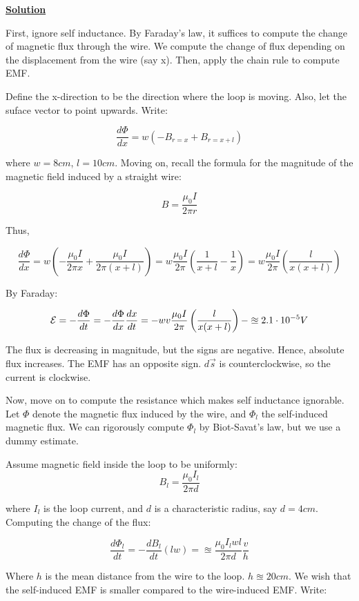\documentclass{article}
\newcommand{\new}[1]{
    \vspace{2mm}
    \noindent
    \textbf{
    \underline{#1}}
}
\begin{document}
\new{Solution}
First, ignore self inductance. By Faraday's law, it suffices 
to compute the change of magnetic flux through the wire. 
We compute the change of flux depending on the displacement from 
the wire (say x). Then, apply the chain rule to compute EMF. 

Define the x-direction to be the direction where the loop is moving. 
Also, let the suface vector to point upwards. 
Write:

\[
    \frac{d \Phi}{dx} = w(-B_{r = x}+B_{r = x+l})
\]

where $w = 8cm$, $l = 10cm$. Moving on, recall the formula for 
the magnitude of the magnetic field induced by a straight wire:

\[
    B = \frac{\mu_0 I}{2\pi r}
\]

\newpage
Thus, 

\[
    \frac{d \Phi}{dx} = w\left(-\frac{\mu_0I}{2\pi x}+
    \frac {\mu_0 I} {2\pi (x+l)}\right)
    = 
    w
    \frac{\mu_0 I}{2\pi}
    \left(
        \frac{1}{x+l} - \frac{1}{x}
    \right)
    = 
w
    \frac{\mu_0 I}{2\pi}
    \left(
        \frac{l}{x(x+l)}
    \right)
\]


By Faraday:

\[
    {\mathcal{E}} = 
    -\frac{d\Phi}{dt} 
    = -\frac{d\Phi}{dx} \frac{dx}{dt}
    =-wv
    \frac{\mu_0 I}{2\pi}
    \left(
        \frac{l}{x(x+l)}
    \right)
    -\approxeq 2.1\cdot 10^{-5} V
\]

The flux is decreasing in magnitude, but the signs are negative. 
Hence, absolute flux increases. The EMF has an opposite sign. 
$d\vec{s}$ is counterclockwise, so the current is clockwise. 

Now, move on to compute the resistance which makes self inductance 
ignorable. Let $\Phi$ denote the magnetic flux induced by the wire, 
and $\Phi_l$ the self-induced magnetic flux. We can rigorously 
compute $\Phi_l$ by Biot-Savat's law, but we use a dummy estimate. 

Assume magnetic field inside the loop to be uniformly:
\[
    B_l = \frac{\mu_0I_l}{2\pi d}
\]

where $I_l$ is the loop current, and $d$ is a characteristic radius, 
say $d = 4cm$. Computing the change of the flux:

\[
    \frac{d\Phi_l}{dt} = -\frac{dB_l}{dt}(lw) =
    \approxeq 
    \frac{\mu_0 I_l w l}{2\pi d} \frac {v}{h}
    \]

Where $h$ is the mean distance from the wire to the loop. 
$h \approxeq 20cm$. 
We wish that the self-induced EMF is smaller compared to 
the wire-induced EMF. Write:
\end{document}
